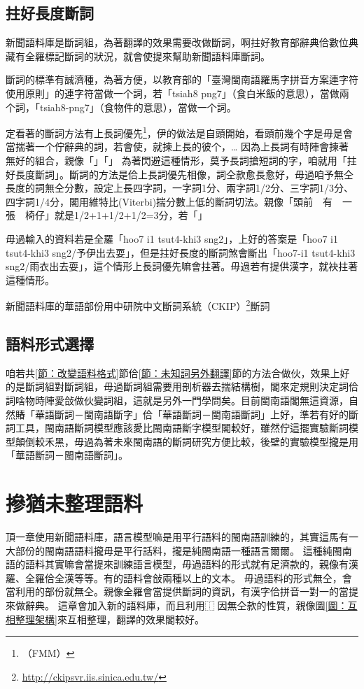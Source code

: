 \documentclass[final,oneside,onecolumn,12pt,a4paper]{book}%
\begin{document}
\section{拄好長度斷詞}
\label{節：拄好長度斷詞}
新聞語料庫是斷詞組，為著翻譯的效果需要改做斷詞，啊拄好教育部辭典佮數位典藏有全羅標記斷詞的狀況，就會使提來幫助新聞語料庫斷詞。

斷詞的標準有誠濟種，為著方便，以教育部的「臺灣閩南語羅馬字拼音方案連字符使用原則」的連字符當做一个詞，若「tsiah8 png7」（食白米飯的意思），當做兩个詞，「tsiah8-png7」（食物件的意思），當做一个詞。

定看著的斷詞方法有上長詞優先\footnote{（FMM）}，伊的做法是自頭開始，看頭前幾个字是毋是會當揣著一个佇辭典的詞，若會使，就揀上長的彼个，…%
因為上長詞有時陣會揀著無好的組合，親像「」「」
為著閃避這種情形，莫予長詞搶短詞的字，咱就用「拄好長度斷詞」。斷詞的方法是佮上長詞優先相像，詞仝款愈長愈好，毋過咱予無仝長度的詞無仝分數，設定上長四字詞，一字詞1分、兩字詞1/2分、三字詞1/3分、四字詞1/4分，閣用維特比(Viterbi)揣分數上低的斷詞切法。親像「頭前　有　一張　椅仔」就是1/2+1+1/2+1/2=3分，若「」%

毋過輸入的資料若是全羅「hoo7 i1 tsut4-khi3 sng2」，上好的答案是「hoo7 i1 tsut4-khi3 sng2/予伊出去耍」，但是拄好長度的斷詞煞會斷出「hoo7-i1 tsut4-khi3 sng2/雨衣出去耍」，這个情形上長詞優先嘛會拄著。毋過若有提供漢字，就袂拄著這種情形。

新聞語料庫的華語部份用中研院中文斷詞系統（CKIP）\footnote{\url{http://ckipsvr.iis.sinica.edu.tw/}}斷詞

\section{語料形式選擇}
\label{節：語料形式選擇}
咱若共\ref{節：改變語料格式}節佮\ref{節：未知詞另外翻譯}節的方法合做伙，效果上好的是斷詞組對斷詞組，毋過斷詞組需要用剖析器去揣結構樹，閣來定規則決定詞佮詞啥物時陣愛敆做伙變詞組，這就是另外一門學問矣。目前閩南語閣無這資源，自然賰「華語斷詞－閩南語斷字」佮「華語斷詞－閩南語斷詞」上好，準若有好的斷詞工具，閩南語斷詞模型應該愛比閩南語斷字模型閣較好，雖然佇這擺實驗斷詞模型顛倒較禾黑，毋過為著未來閩南語的斷詞研究方便比較，後壁的實驗模型攏是用「華語斷詞－閩南語斷詞」。

\chapter{摻猶未整理語料}
\label{章：摻猶未整理語料}
頂一章使用新聞語料庫，語言模型嘛是用平行語料的閩南語訓練的，其實這馬有一大部份的閩南語語料攏毋是平行話料，攏是純閩南語一種語言爾爾。
這種純閩南語的語料其實嘛會當提來訓練語言模型，毋過語料的形式就有足濟款的，親像有漢羅、全羅佮全漢等等。有的語料會敆兩種以上的文本。
毋過語料的形式無仝，會當利用的部份就無仝。親像全羅會當提供斷詞的資訊，有漢字佮拼音一對一的當提來做辭典。
這章會加入新的語料庫，而且利用⿰因無仝款的性質，親像圖\ref{圖：互相整理架構}來互相整理，翻譯的效果閣較好。
\end{document}
